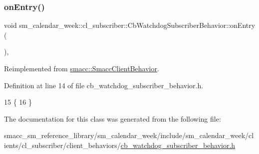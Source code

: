 \subsubsection{\texorpdfstring{on\+Entry()}{onEntry()}}
{\footnotesize\ttfamily void sm\+\_\+calendar\+\_\+week\+::cl\+\_\+subscriber\+::\+Cb\+Watchdog\+Subscriber\+Behavior\+::on\+Entry (\begin{DoxyParamCaption}{ }\end{DoxyParamCaption})\hspace{0.3cm}{\ttfamily [inline]}, {\ttfamily [virtual]}}



Reimplemented from \hyperlink{classsmacc_1_1SmaccClientBehavior_ad5d3e1f1697c3cfe66c94cadba948493}{smacc\+::\+Smacc\+Client\+Behavior}.



Definition at line 14 of file cb\+\_\+watchdog\+\_\+subscriber\+\_\+behavior.\+h.


\begin{DoxyCode}
15     \{
16     \}
\end{DoxyCode}


The documentation for this class was generated from the following file\+:\begin{DoxyCompactItemize}
\item 
smacc\+\_\+sm\+\_\+reference\+\_\+library/sm\+\_\+calendar\+\_\+week/include/sm\+\_\+calendar\+\_\+week/clients/cl\+\_\+subscriber/client\+\_\+behaviors/\hyperlink{sm__calendar__week_2include_2sm__calendar__week_2clients_2cl__subscriber_2client__behaviors_2cb_36e06d0e8a2b4ac94bf461d1b035e759}{cb\+\_\+watchdog\+\_\+subscriber\+\_\+behavior.\+h}\end{DoxyCompactItemize}
